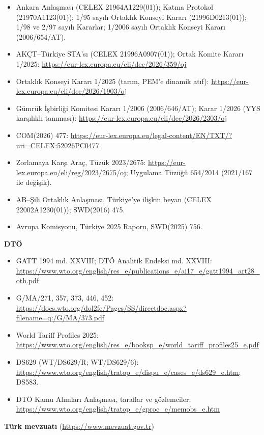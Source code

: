 \begin{itemize}
\tightlist
\item
  Ankara Anlaşması (CELEX 21964A1229(01)); Katma Protokol (21970A1123(01)); 1/95 sayılı Ortaklık Konseyi Kararı (21996D0213(01)); 1/98 ve 2/97 sayılı Kararlar; 1/2006 sayılı Ortaklık Konseyi Kararı (2006/654/AT).
\item
  AKÇT--Türkiye STA'sı (CELEX 21996A0907(01)); Ortak Komite Kararı 1/2025: \url{https://eur-lex.europa.eu/eli/dec/2026/359/oj}
\item
  Ortaklık Konseyi Kararı 1/2025 (tarım, PEM'e dinamik atıf): \url{https://eur-lex.europa.eu/eli/dec/2026/1903/oj}
\item
  Gümrük İşbirliği Komitesi Kararı 1/2006 (2006/646/AT); Karar 1/2026 (YYS karşılıklı tanıması): \url{https://eur-lex.europa.eu/eli/dec/2026/2303/oj}
\item
  COM(2026) 477: \url{https://eur-lex.europa.eu/legal-content/EN/TXT/?uri=CELEX:52026PC0477}
\item
  Zorlamaya Karşı Araç, Tüzük 2023/2675: \url{https://eur-lex.europa.eu/eli/reg/2023/2675/oj;} Uygulama Tüzüğü 654/2014 (2021/167 ile değişik).
\item
  AB--Şili Ortaklık Anlaşması, Türkiye'ye ilişkin beyan (CELEX 22002A1230(01)); SWD(2016) 475.
\item
  Avrupa Komisyonu, Türkiye 2025 Raporu, SWD(2025) 756.
\end{itemize}

\textbf{DTÖ}

\begin{itemize}
\tightlist
\item
  GATT 1994 md. XXVIII; DTÖ Analitik Endeksi md. XXVIII: \url{https://www.wto.org/english/res_e/publications_e/ai17_e/gatt1994_art28_oth.pdf}
\item
  G/MA/271, 357, 373, 446, 452: \url{https://docs.wto.org/dol2fe/Pages/SS/directdoc.aspx?filename=q:/G/MA/373.pdf}
\item
  World Tariff Profiles 2025: \url{https://www.wto.org/english/res_e/booksp_e/world_tariff_profiles25_e.pdf}
\item
  DS629 (WT/DS629/R; WT/DS629/6): \url{https://www.wto.org/english/tratop_e/dispu_e/cases_e/ds629_e.htm;} DS583.
\item
  DTÖ Kamu Alımları Anlaşması, taraflar ve gözlemciler: \url{https://www.wto.org/english/tratop_e/gproc_e/memobs_e.htm}
\end{itemize}

\textbf{Türk mevzuatı} (\url{https://www.mevzuat.gov.tr})

